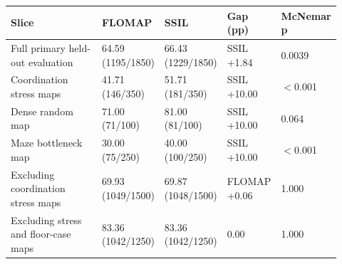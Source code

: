 \scriptsize
\setlength{\tabcolsep}{4pt}
\begin{tabular}{p{0.34\linewidth}p{0.16\linewidth}p{0.16\linewidth}p{0.14\linewidth}p{0.12\linewidth}}
\toprule
Slice & FLOMAP & SSIL & Gap (pp) & McNemar p \\
\midrule
Full primary held-out evaluation & 64.59 (1195/1850) & 66.43 (1229/1850) & SSIL +1.84 & 0.0039 \\
Coordination stress maps & 41.71 (146/350) & 51.71 (181/350) & SSIL +10.00 & $<$0.001 \\
Dense random map & 71.00 (71/100) & 81.00 (81/100) & SSIL +10.00 & 0.064 \\
Maze bottleneck map & 30.00 (75/250) & 40.00 (100/250) & SSIL +10.00 & $<$0.001 \\
Excluding coordination stress maps & 69.93 (1049/1500) & 69.87 (1048/1500) & FLOMAP +0.06 & 1.000 \\
Excluding stress and floor-case maps & 83.36 (1042/1250) & 83.36 (1042/1250) & 0.00 & 1.000 \\
\bottomrule
\end{tabular}
